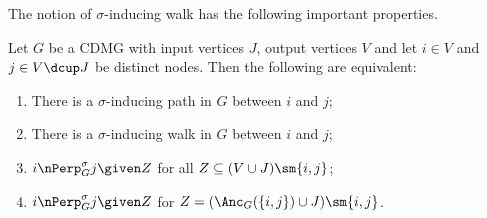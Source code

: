 The notion of $\sigma$-inducing walk has the following important properties.
\begin{Prp}\label{prp:sigma-inducing_path_properties}
  Let $G$ be a CDMG with input vertices $J$, output vertices $V$ and let $i \in V$ and $j \in V \dcup J$ be distinct nodes. 
  Then the following are equivalent:
  \begin{enumerate}[label=(\roman*)]
    \item There is a $\sigma$-inducing path in $G$ between $i$ and $j$;\label{prp:sigma-inducing_path_properties2:i}
    \item There is a $\sigma$-inducing walk in $G$ between $i$ and $j$;\label{prp:sigma-inducing_path_properties2:ii}
    \item $i \nPerp^\sigma_G j \given Z$ for all $Z \subseteq (V \cup J) \sm \{i,j\}$;\label{prp:sigma-inducing_path_properties2:iii}
    \item $i \nPerp^\sigma_G j \given Z$ for $Z = (\Anc_G(\{i,j\}) \cup J) \sm \{i,j\}$.\label{prp:sigma-inducing_path_properties2:iv}
  \end{enumerate}
\end{Prp}
